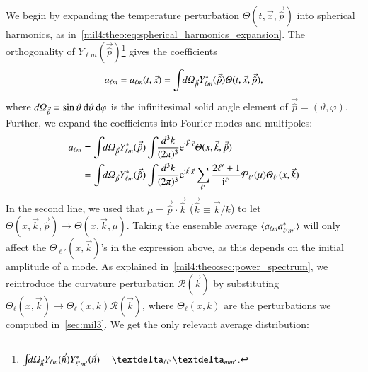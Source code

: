We begin by expanding the temperature perturbation $\Theta(t, \vec{x}, \vec{\hat{p}})$ into spherical harmonics, as in~\cref{mil4:theo:eq:spherical_harmonics_expansion}.
The orthogonality of $Y_{\ell m}(\vec{\hat{p}})$\footnote{$\int \dOmg[n] Y\ellm(\vec{\hat{n}}) Y\ellmp^*(\vec{\hat{n}}) = \deltasym{\ell \ell'} \deltasym{m m'} $.} gives the coefficients
\begin{equation}
    a\ellm = a\ellm(t,\vec{x}) = \int \dOmg[p] Y^*_{\ell m} (\vec{\hat{p}}) \Theta(t, \vec{x}, \vec{\hat{p}}),
\end{equation}
where $d\varOmega_{\vec{\hat{p}}} = \sin{\vartheta} \diff \vartheta\diff \varphi$ is the infinitesimal solid angle element of $\vec{\hat{p}} = (\vartheta, \varphi)$. Further, we expand the coefficients into Fourier modes and multipoles:
\begin{equation}\label{mil4:theo:eq:a_ellm_expansions}
\begin{split}
    a_{\ell m} &= \int \dOmg[p] Y^*_{\ell m} (\vec{\hat{p}}) \int \dkkk \eu[\im \vec{k}\cdot \vec{x}] \Theta(x, \vec{k}, \vec{\hat{p}})  \\
    &= \int \dOmg[p] Y^*_{\ell m} (\vec{\hat{p}}) \int \dkkk \eu[\im \vec{k}\cdot \vec{x}]\sum_{\ell'} \frac{2\ell' + 1}{\im^{\ell'}} \mathcal{P}_{\ell'}(\mu) \Theta_{\ell'}(x, \vec{k})
\end{split}
\end{equation}
In the second line, we used that $\mu=\vec{\hat{p}}\cdot\vec{\hat{k}}$ ($\vec{\hat{k}}\equiv \vec{k}/k$) to let $\Theta(x,\vec{k}, \vec{\hat{p}}) \to\Theta(x,\vec{k},\mu) $. Taking the ensemble average $\langle a\ellm a^*\ellmp \rangle$ will only affect the $\Theta_{\ell'}(x, \vec{k})$'s in the expression above, as this depends on the initial amplitude of a mode. As explained in~\cref{mil4:theo:sec:power_spectrum}, we reintroduce the curvature perturbation $\mathcal{R}(\vec{k})$ by substituting $\Theta_\ell(x,\vec{k}) \to \Theta_\ell(x,k) \mathcal{R}(\vec{k})$, where $\Theta_\ell(x, k)$ are the perturbations we computed in~\cref{sec:mil3}. We get the only relevant average distribution:

